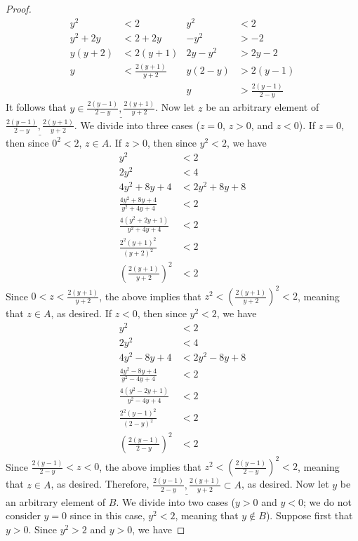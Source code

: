 \documentclass[../main.tex]{subfiles}
\begin{document}
\begin{exercise}
\begin{proof}
        \begin{align*}
            y^2 &< 2&
                y^2 &< 2\\
            y^2+2y &< 2+2y&
                -y^2 &> -2\\
            y(y+2) &< 2(y+1)&
                2y-y^2 &> 2y-2\\
            y &< \frac{2(y+1)}{y+2}&
                y(2-y) &> 2(y-1)\\
            &&
                y &> \frac{2(y-1)}{2-y}
        \end{align*}
        It follows that $y\in\underline{\frac{2(y-1)}{2-y},\frac{2(y+1)}{y+2}}$. Now let $z$ be an arbitrary element of $\underline{\frac{2(y-1)}{2-y},\frac{2(y+1)}{y+2}}$. We divide into three cases ($z=0$, $z>0$, and $z<0$). If $z=0$, then since $0^2<2$, $z\in A$. If $z>0$, then since $y^2<2$, we have
        \begin{align*}
            y^2 &< 2\\
            2y^2 &< 4\\
            4y^2+8y+4 &< 2y^2+8y+8\\
            \frac{4y^2+8y+4}{y^2+4y+4} &< 2\\
            \frac{4(y^2+2y+1)}{y^2+4y+4} &< 2\\
            \frac{2^2(y+1)^2}{(y+2)^2} &< 2\\
            \left( \frac{2(y+1)}{y+2} \right)^2 &< 2
        \end{align*}
        Since $0<z<\frac{2(y+1)}{y+2}$, the above implies that $z^2<\left( \frac{2(y+1)}{y+2} \right)^2<2$, meaning that $z\in A$, as desired. If $z<0$, then since $y^2<2$, we have
        \begin{align*}
            y^2 &< 2\\
            2y^2 &< 4\\
            4y^2-8y+4 &< 2y^2-8y+8\\
            \frac{4y^2-8y+4}{y^2-4y+4} &< 2\\
            \frac{4(y^2-2y+1)}{y^2-4y+4} &< 2\\
            \frac{2^2(y-1)^2}{(2-y)^2} &< 2\\
            \left( \frac{2(y-1)}{2-y} \right)^2 &< 2
        \end{align*}
        Since $\frac{2(y-1)}{2-y}<z<0$, the above implies that $z^2<\left( \frac{2(y-1)}{2-y} \right)^2<2$, meaning that $z\in A$, as desired. Therefore, $\underline{\frac{2(y-1)}{2-y},\frac{2(y+1)}{y+2}}\subset A$, as desired. Now let $y$ be an arbitrary element of $B$. We divide into two cases ($y>0$ and $y<0$; we do not consider $y=0$ since in this case, $y^2<2$, meaning that $y\notin B$). Suppose first that $y>0$. Since $y^2>2$ and $y>0$, we have

\end{proof}
\end{exercise}
\end{document}
